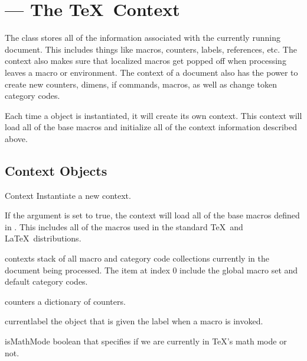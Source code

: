 
\section{ --- The \TeX\ Context\label{sec:context-api}}


The  class stores all of the information associated with
the currently running document.  This includes things like macros, counters, 
labels, references, etc.  The context also makes sure that localized macros
get popped off when processing leaves a macro or environment.  The context
of a document also has the power to create new counters, dimens, if commands,
macros, as well as change token category codes.

Each time a  object is instantiated, it will create its own 
context.  This context will load all of the base macros and initialize
all of the context information described above.


\subsection{Context Objects}

\begin{classdesc}{Context}{}
Instantiate a new context.

If the  argument is set to true, the context will load all of the
base macros defined in \plasTeX.  This includes all of the macros used in 
the standard \TeX\ and \LaTeX\ distributions.
\end{classdesc}

\begin{memberdesc}[Context]{contexts}
stack of all macro and category code collections currently in the document 
being processed.  The item at index 0 include the global macro set and 
default category codes.
\end{memberdesc}

\begin{memberdesc}[Context]{counters}
a dictionary of counters.
\end{memberdesc}

\begin{memberdesc}[Context]{currentlabel}
the object that is given the label when a  macro is invoked.
\end{memberdesc}

\begin{memberdesc}[Context]{isMathMode}
boolean that specifies if we are currently in \TeX's math mode or not.
\end{memberdesc}

